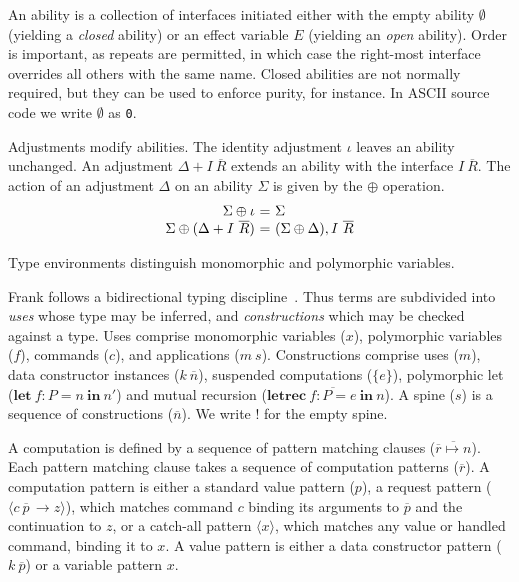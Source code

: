 \documentclass[11pt]{article}
\makeatletter
\newcommand{\many}{\overline}
\newcommand\ba{\begin{array}}
\newcommand\ea{\end{array}}
\newenvironment{equations}{\[\ba{@{}r@{~}c@{~}l@{}}}{\ea\]\ignorespacesafterend}
\newcommand{\sig}{I}
\newcommand{\sigs}{\Sigma}
\newcommand{\key}[1]{\textbf{#1}} %
\newcommand{\handleSymbol}{\rightarrow}
\newcommand{\handle}[2]{{#1} \handleSymbol {#2}}
\newcommand{\thunk}[1]{\{{#1}\}}
\newcommand{\adj}{\Delta}
\newcommand{\ev}{E}
\newcommand{\effin}[1]{\langle {#1} \rangle}
\newcommand{\id}{\iota}
\makeatother
\begin{document}
An ability is a collection of interfaces initiated either with the
empty ability $\emptyset$ (yielding a \emph{closed} ability) or an
effect variable $\ev$ (yielding an \emph{open} ability). Order is
important, as repeats are permitted, in which case the right-most
interface overrides all others with the same name.
%
Closed abilities are not normally required, but they can be used to
enforce purity, for instance. In ASCII source code we write
$\emptyset$ as \verb!0!.

Adjustments modify abilities. The identity adjustment $\id$ leaves an
ability unchanged. An adjustment $\adj + \sig~\many{R}$ extends an
ability with the interface $\sig~\many{R}$. The action of an
adjustment $\Delta$ on an ability $\sigs$ is given by the $\oplus$
operation.
%
\begin{equations}
\sigs \oplus \id                    &=& \sigs \\
\sigs \oplus (\adj + \sig~\many{R}) &=& (\sigs \oplus \adj), \sig~\many{R} \\
\end{equations}
%

Type environments distinguish monomorphic and polymorphic variables.

Frank follows a bidirectional typing discipline~\cite{PierceT00}. Thus
terms are subdivided into \emph{uses} whose type may be inferred, and
\emph{constructions} which may be checked against a type. Uses
comprise monomorphic variables ($x$), polymorphic variables ($f$),
commands ($c$), and applications ($m~s$). Constructions comprise uses
($m$), data constructor instances ($k~\many{n}$), suspended
computations ($\thunk{e}$), polymorphic let ($\key{let}~f : P =
n~\key{in}~n'$) and mutual recursion ($\key{letrec}~\many{f : P =
  e}~\key{in}~n$).
%
A spine ($s$) is a sequence of constructions ($\many{n}$). We write
$!$ for the empty spine.

A computation is defined by a sequence of pattern matching clauses
($\many{\many{r} \mapsto n}$).
%
Each pattern matching clause takes a sequence of computation patterns
($\many{r}$). A computation pattern is either a standard value pattern
($p$), a request pattern ($\effin{\handle{c~\many{p}\,}{z}}$), which
matches command $c$ binding its arguments to $\many{p}$ and the
continuation to $z$, or a catch-all pattern $\effin{x}$, which matches
any value or handled command, binding it to $x$.
%
A value pattern is either a data constructor pattern ($k~\many{p}$) or
a variable pattern $x$.
\end{document}
